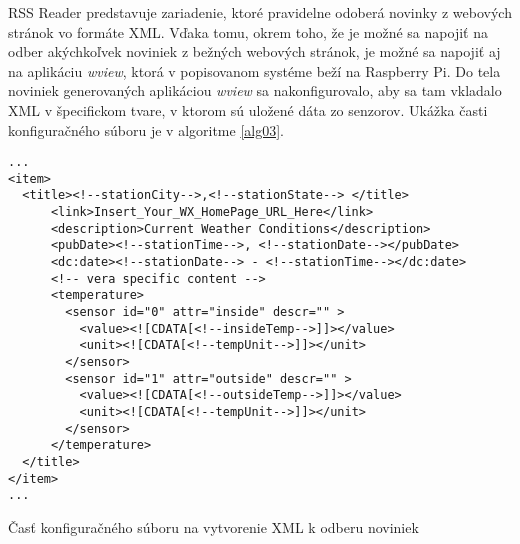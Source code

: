 \indent RSS Reader predstavuje zariadenie, ktoré pravidelne odoberá novinky z webových stránok vo formáte XML. Vďaka tomu, okrem toho, že je možné sa napojiť na odber akýchkoľvek noviniek z bežných webových stránok, je možné sa napojiť aj na aplikáciu \textit{wview}, ktorá v popisovanom systéme beží na Raspberry Pi. Do tela noviniek generovaných aplikáciou \textit{wview} sa nakonfigurovalo, aby sa tam vkladalo XML v špecifickom tvare, v ktorom sú uložené dáta zo senzorov. 
Ukážka časti konfiguračného súboru je v algoritme \ref{alg03}.
\begin{algorithm}
%
\begin{lstlisting}
...
<item>
  <title><!--stationCity-->,<!--stationState--> </title>
      <link>Insert_Your_WX_HomePage_URL_Here</link>
      <description>Current Weather Conditions</description>
      <pubDate><!--stationTime-->, <!--stationDate--></pubDate>
      <dc:date><!--stationDate--> - <!--stationTime--></dc:date>
	  <!-- vera specific content -->
	  <temperature>
	    <sensor id="0" attr="inside" descr="" >
		  <value><![CDATA[<!--insideTemp-->]]></value>
		  <unit><![CDATA[<!--tempUnit-->]]></unit>
		</sensor>
	    <sensor id="1" attr="outside" descr="" >
		  <value><![CDATA[<!--outsideTemp-->]]></value>
		  <unit><![CDATA[<!--tempUnit-->]]></unit>
		</sensor>
	  </temperature>
  </title>
</item>
...
\end{lstlisting}
 \caption{Časť konfiguračného súboru na vytvorenie XML k odberu noviniek}
 \label{alg03}
\end{algorithm}

